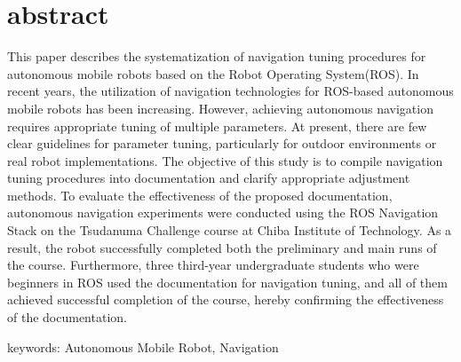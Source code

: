 \chapter*{abstract}
\thispagestyle{empty}
%
\begin{center}
  \scalebox{1.3}{Systematization of Navigation Adjustment Procedures}
  \scalebox{1.3}{for ROS-Based Autonomous Mobile Robots}
\end{center}
\vspace{1.0zh}
%
This paper describes the systematization of navigation tuning procedures for autonomous mobile robots based on the Robot Operating System(ROS). 
In recent years, the utilization of navigation technologies for ROS-based autonomous mobile robots has been increasing. 
However, achieving autonomous navigation requires appropriate tuning of multiple parameters. 
At present, there are few clear guidelines for parameter tuning, particularly for outdoor environments or real robot implementations. 
The objective of this study is to compile navigation tuning procedures into documentation and clarify appropriate adjustment methods. 
To evaluate the effectiveness of the proposed documentation, autonomous navigation experiments were conducted using the ROS Navigation Stack on the Tsudanuma Challenge course at Chiba Institute of Technology. 
As a result, the robot successfully completed both the preliminary and main runs of the course. 
Furthermore, three third-year undergraduate students who were beginners in ROS used the documentation for navigation tuning, and all of them achieved successful completion of the course, 
hereby confirming the effectiveness of the documentation. 

\vspace{1.0zh}

keywords: Autonomous Mobile Robot, Navigation
